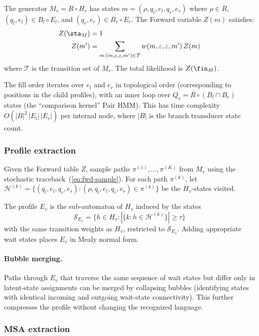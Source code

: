 The generator $M_v = R \circ H_v$ has states $m = (\rho, q_l, e_l, q_r, e_r)$
where $\rho \in R$, $(q_l,e_l) \in B_l \circ E_l$, and $(q_r,e_r) \in B_r \circ E_r$.
The Forward variable $Z(m)$ satisfies:
\begin{align}
Z(\sta_M) &= 1 \label{eq:profile-fwd-base}\\
Z(m') &= \sum_{m : (m,\varepsilon,\varepsilon,m') \in \mathcal{T}} w(m,\varepsilon,\varepsilon,m')\, Z(m) \label{eq:profile-fwd-rec}
\end{align}
where $\mathcal{T}$ is the transition set of $M_v$.
The total likelihood is $Z(\fin_M)$.

The fill order iterates over $e_l$ and $e_r$ in topological order
(corresponding to positions in the child profiles),
with an inner loop over $Q_v = R \circ (B_l \cap B_r)$ states
(the ``comparison kernel'' Pair HMM).
This has time complexity $O(|B|^2\, |E_l|\, |E_r|)$ per internal node,
where $|B|$ is the branch transducer state count.

\subsubsection{Profile extraction}

Given the Forward table $Z$, sample paths $\pi^{(1)},\ldots,\pi^{(K)}$ from $M_v$
using the stochastic traceback~(\ref{eq:fwd-sample}).
For each path $\pi^{(k)}$, let $\mathcal{H}^{(k)} = \{(q_l,e_l,q_r,e_r) : (\rho,q_l,e_l,q_r,e_r) \in \pi^{(k)}\}$
be the $H_v$-states visited.

The profile $E_v$ is the sub-automaton of $H_v$ induced by the states
\[
\mathcal{S}_{E_v} = \{ h \in H_v : |\{k : h \in \mathcal{H}^{(k)}\}| \geq \tau \}
\]
with the same transition weights as $H_v$, restricted to $\mathcal{S}_{E_v}$.
Adding appropriate wait states places $E_v$ in Mealy normal form.

\paragraph{Bubble merging.}
Paths through $E_v$ that traverse the same sequence of wait states
but differ only in latent-state assignments can be merged by collapsing bubbles
(identifying states with identical incoming and outgoing wait-state connectivity).
This further compresses the profile without changing the recognized language.

\subsubsection{MSA extraction}

